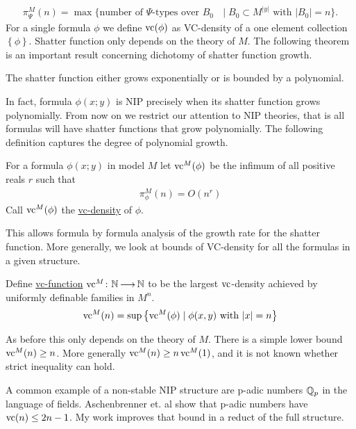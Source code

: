 \documentclass[final]{beamer}
\newcommand{\curly}[1]{\left\{ #1 \right\}}
\newcommand{\defn}{\underline}
\newlength{\twocolwid}
\begin{document}
\begin{frame}[t]
\begin{columns}[t]
\begin{column}{\twocolwid}
    \begin{align*}
        \pi^M_\Psi(n) = \max \{ \text {number of $\Psi$-types over $B_0$ } \mid B_0 \subset M^{|y|} \text{ with } |B_0| = n\}.
    \end{align*}
    For a single formula $\phi$ we define $\operatorname{vc}(\phi)$ as VC-density of a one element collection $\curly{\phi}$.
    Shatter function only depends on the theory of $M$.
    The following theorem is an important result concerning dichotomy of shatter function growth.
    \begin{Theorem} 
        The shatter function either grows exponentially or is bounded by a polynomial.
    \end{Theorem}
    In fact, formula $\phi(x; y)$ is NIP precisely when its shatter function grows polynomially.
    From now on we restrict our attention to NIP theories, that is all formulas will have shatter functions that grow polynomially.
    The following definition captures the degree of polynomial growth.
    \begin{Definition}
        For a formula $\phi(x; y)$ in model $M$ let $\operatorname{vc}^M(\phi)$ be the infimum of all positive reals $r$ such that
        \begin{align*}
            \pi^M_\phi(n) = O(n^r)
        \end{align*}
        Call $\operatorname{vc}^M(\phi)$ the \defn{vc-density} of $\phi$.
    \end{Definition}
    This allows formula by formula analysis of the growth rate for the shatter function.
    More generally, we look at bounds of VC-density for all the formulas in a given structure.
    \begin{Definition}
        Define \defn{vc-function} $\operatorname{vc}^M \colon \mathbb{N} \operatorname{\longrightarrow} \mathbb{N}$ to be the largest $\operatorname{vc}$-density achieved by uniformly definable families in $M^n$.
        \begin{align*}
            \vc^M(n) = \sup \curly{ \vc^M(\phi) \mid \phi(x, y) \text{ with } |x| = n}
        \end{align*}        
    \end{Definition}
    As before this only depends on the theory of $M$.
    There is a simple lower bound $\operatorname{vc}^M(n) \geq n$.
    More generally $\operatorname{vc}^M(n) \geq n\operatorname{vc}^M(1)$, and it is not known whether strict inequality can hold.

    
    A common example of a non-stable NIP structure are p-adic numbers $\mathbb{Q}_p$ in the language of fields.
    Aschenbrenner et. al show that p-adic numbers have $\operatorname{vc}(n) \leq 2n - 1$.
    My work improves that bound in a reduct of the full structure.


\end{column}
\end{columns}
\end{frame}
\end{document}
